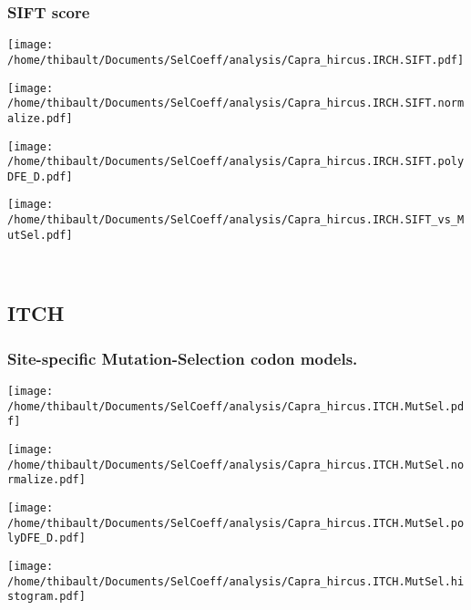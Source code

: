\subsubsection*{SIFT score} 
\begin{minipage}{0.49\linewidth} 
\texttt{[image: /home/thibault/Documents/SelCoeff/analysis/Capra\_hircus.IRCH.SIFT.pdf]} 
\end{minipage}
\begin{minipage}{0.49\linewidth} 
\texttt{[image: /home/thibault/Documents/SelCoeff/analysis/Capra\_hircus.IRCH.SIFT.normalize.pdf]} 
\end{minipage}
\begin{minipage}{0.49\linewidth} 
\texttt{[image: /home/thibault/Documents/SelCoeff/analysis/Capra\_hircus.IRCH.SIFT.polyDFE\_D.pdf]} 
\end{minipage}
\begin{minipage}{0.49\linewidth} 
\texttt{[image: /home/thibault/Documents/SelCoeff/analysis/Capra\_hircus.IRCH.SIFT\_vs\_MutSel.pdf]} 
\end{minipage}
\\ 
\subsection{ITCH} 
 
\subsubsection*{Site-specific Mutation-Selection codon models.} 
\begin{minipage}{0.49\linewidth} 
\texttt{[image: /home/thibault/Documents/SelCoeff/analysis/Capra\_hircus.ITCH.MutSel.pdf]} 
\end{minipage}
\begin{minipage}{0.49\linewidth} 
\texttt{[image: /home/thibault/Documents/SelCoeff/analysis/Capra\_hircus.ITCH.MutSel.normalize.pdf]} 
\end{minipage}
\begin{minipage}{0.49\linewidth} 
\texttt{[image: /home/thibault/Documents/SelCoeff/analysis/Capra\_hircus.ITCH.MutSel.polyDFE\_D.pdf]} 
\end{minipage}
\begin{minipage}{0.49\linewidth} 
\texttt{[image: /home/thibault/Documents/SelCoeff/analysis/Capra\_hircus.ITCH.MutSel.histogram.pdf]} 
\end{minipage}
\\ 
